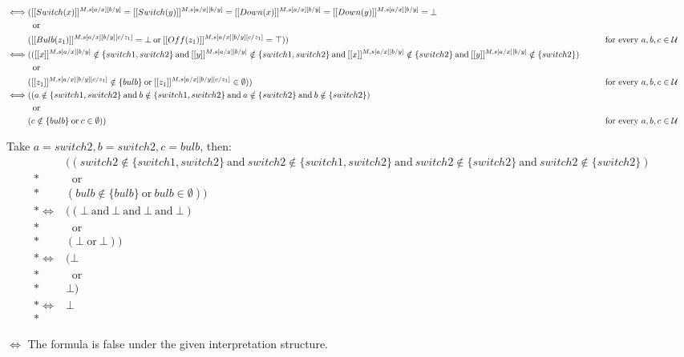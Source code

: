 \documentclass{article}
\begin{document}
\begin{align*}
  \iff& ([[ Switch(x)]]^{M, s[a/x][b/y]} 
  = [[Switch(y)]]^{M, s[a/x][b/y]} 
  = [[Down(x)]]^{M, s[a/x][b/y]} 
  = [[Down(y) ]]^{M, s[a/x][b/y]} = \bot &&\\
  & \: \text{ or } \: &&\\
  &([[Bulb(z_1)]]^{M, s[a/x][b/y][c/z_1]} = \bot \: \text{or} \: [[Off(z_1)]]^{M, s[a/x][b/y][c/z_1]} = \top)) 
  &&\text{\qquad for every $a,b,c \in \mathcal{U}$} &&\\
  \iff& (([[x]]^{M, s[a/x][b/y]} \notin \{ switch1, switch2 \} 
  \: \text{and} \: 
  [[y]]^{M, s[a/x][b/y]} \notin \{ switch1, switch2 \}
  \: \text{and} \: 
  [[x]]^{M, s[a/x][b/y]} \notin \{ switch2 \}
  \: \text{and} \: 
  [[y]]^{M, s[a/x][b/y]} \notin \{ switch2 \}) &&\\
  & \: \text{ or } \: &&\\
  &([[z_1]]^{M, s[a/x][b/y][c/z_1]} \notin \{ bulb \} \: \text{or} \: [[z_1]]^{M, s[a/x][b/y][c/z_1]} \in \emptyset)) 
  &&\text{\qquad for every $a,b,c \in \mathcal{U}$} &&\\
  \iff& ((a \notin \{ switch1, switch2 \} 
  \: \text{and} \: 
  b \notin \{ switch1, switch2 \}
  \: \text{and} \: 
  a \notin \{ switch2 \}
  \: \text{and} \: 
  b \notin \{ switch2 \}) &&\\
  & \: \text{ or } \: &&\\
  &(c \notin \{ bulb \} \: \text{or} \: c \in \emptyset)) 
  &&\text{\qquad for every $a,b,c \in \mathcal{U}$} &&\\
\end{align*}


  Take $a = switch2, b = switch2, c = bulb$, then:
  \begin{align*}
    & ((switch2 \notin \{ switch1, switch2 \} 
    \: \text{and} \: 
    switch2 \notin \{ switch1, switch2 \}
    \: \text{and} \: 
    switch2 \notin \{ switch2 \}
    \: \text{and} \: 
    switch2 \notin \{ switch2 \}) &&\\*
    & \: \text{ or } \: &&\\*
    &(bulb \notin \{ bulb \} \: \text{or} \: bulb \in \emptyset)) &&\\*
    \iff& ((\bot
    \: \text{and} \: 
    \bot
    \: \text{and} \: 
    \bot
    \: \text{and} \: 
    \bot) &&\\*
    & \: \text{ or } \: &&\\*
    &(\bot \: \text{or} \: \bot)) &&\\*
    \iff& (\bot &&\\*
    & \: \text{ or } \: &&\\*
    &\bot) &&\\*
    \iff& \bot &&\\*
  \end{align*}

  $\iff$ The formula is false under the given interpretation structure.
\end{document}
